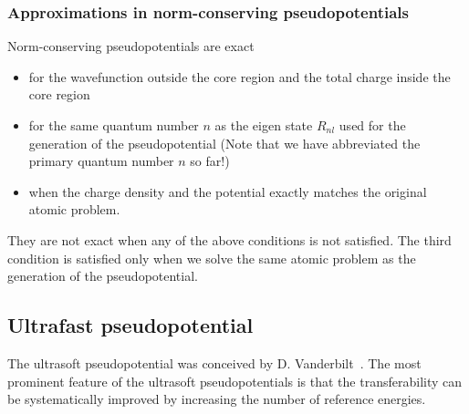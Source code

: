 \documentclass{article}
\begin{document}
\subsubsection{Approximations in norm-conserving pseudopotentials}
Norm-conserving pseudopotentials are exact
\begin{itemize} 
  \item for the wavefunction outside the core region and the total charge inside the core region
  \item for the same quantum number $n$ as the eigen state $R_{nl}$ used for the generation of the pseudopotential (Note that we have abbreviated the primary quantum number $n$ so far!)
  \item when the charge density and the potential exactly matches the original atomic problem.
\end{itemize}
They are not exact when any of the above conditions is not satisfied. The third condition is satisfied only when we solve the same atomic problem as the generation of the pseudopotential.

\subsection{Ultrafast pseudopotential}
The ultrasoft pseudopotential was conceived by D. Vanderbilt~\cite{PhysRevB.41.7892}.
The most prominent feature of the ultrasoft pseudopotentials is that the transferability can be systematically improved by increasing the number of reference energies.
\end{document}
